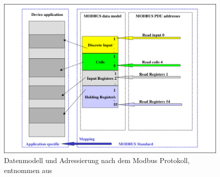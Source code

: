 \begin{figure}
\centering
\includegraphics[width=\textwidth]{abbildungen/20160319_modbusadresse}
\caption[Datenmodell und Adressierung nach dem Modbus Protokoll]{Datenmodell und Adressierung nach dem Modbus Protokoll, entnommen aus \cite[S.~8]{mod12}}
\label{fig:modbusadresse}
\end{figure}

